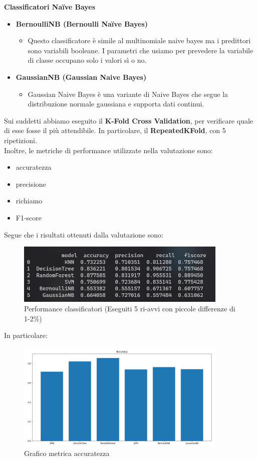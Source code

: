 \documentclass{article}
\begin{document}
\textbf{Classificatori Naïve Bayes}
\begin{itemize}
    \item \textbf{BernoulliNB (Bernoulli Naïve Bayes)}
    \begin{itemize} \item Questo classificatore è simile al multinomiale naive bayes ma i predittori sono variabili booleane. I parametri che usiamo per prevedere la variabile di classe occupano solo i valori sì o no.
    \end{itemize}
    \item \textbf{GaussianNB (Gaussian Naive Bayes)}
    \begin{itemize} \item Gaussian Naive Bayes è una variante di Naive Bayes che segue la distribuzione normale gaussiana e supporta dati continui.
    \end{itemize}
\end{itemize}
%
Sui suddetti abbiamo eseguito  il \textbf{K-Fold Cross Validation}, per verificare quale di esse fosse il più attendibile. In particolare, il \textbf{RepeatedKFold}, con 5 ripetizioni.\\
Inoltre, le metriche di performance utilizzate nella valutazione sono:
\begin{itemize}
    \item accuratezza 
    \item precisione
    \item richiamo
    \item F1-score
\end{itemize}

Segue che i risultati ottenuti dalla valutazione sono:
\begin{figure}[H]
        \includegraphics[width=0.9\textwidth]{imagModel}
        \centering
        \caption{Performance classificatori (Eseguiti 5 ri-avvi con piccole differenze di 1-2\%)}
        \centering
\end{figure}

In particolare:

\begin{figure}[H]
        \includegraphics[width=0.9\textwidth]{Accuracy}
        \centering
        \caption{Grafico metrica accuratezza}
        \centering
\end{figure}
\end{document}
